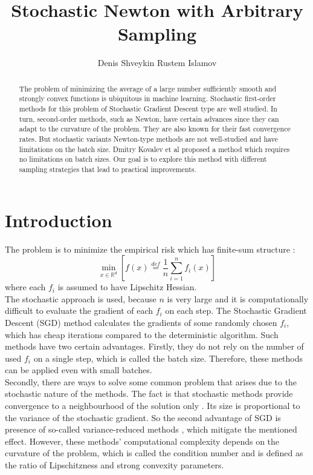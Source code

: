 \documentclass{article}
\title{Stochastic Newton with Arbitrary Sampling}
\author{Denis Shveykin
	\And
	Rustem Islamov
}
\date{}
\begin{document}
	
\maketitle

\begin{abstract}
	
	The problem of minimizing the average of a large number sufficiently smooth and strongly convex functions is ubiquitous in machine learning. Stochastic first-order methods for this problem of Stochastic Gradient Descent type are well studied. In turn, second-order methods, such as Newton, have certain advances since they can adapt to the curvature of the problem. They are also known for their fast convergence rates. But stochastic variants Newton-type methods are not well-studied and have limitations on the batch size. Dmitry Kovalev et al proposed a method which requires no limitations on batch sizes. Our goal is to explore this method with different sampling strategies that lead to practical improvements.
	
\end{abstract}


\keywords{}

\section{Introduction}

	The problem is to minimize the empirical risk which has finite-sum structure \cite{kovalev2019stochastic}:
	\begin{equation}
		\underset{x \in \mathbb R^d}{\min} \left[ f(x) \overset{def}{=} \frac{1}{n} \sum \limits_{i=1}^n f_i(x) \right]
	\end{equation}
	where each $f_i$ is assumed to have Lipschitz Hessian. \\
	
	The stochastic approach is used, because $n$ is very large and it is computationally difficult to evaluate the gradient of each $f_i$ on each step. The Stochastic Gradient Descent (SGD) method \cite{SGD-1} calculates the gradients of some randomly chosen $f_i$, which has cheap iterations compared to the deterministic algorithm. Such methods have two certain advantages. Firstly, they do not rely on the number of used $f_i$ on a single step, which is called the batch size. Therefore, these methods can be applied even with small batches. \\
	
	Secondly, there are ways to solve some common problem that arises due to the stochastic nature of the methods. The fact is that stochastic methods provide convergence to a neighbourhood of the solution only \cite{sgd-hogwild, sgd-general-analysis}. Its size is proportional to the variance of the stochastic gradient. So the second advantage of SGD is presence of so-called variance-reduced methods \cite{exp-convergence, advances-NIPS, unified-sgd, one-method}, which mitigate the mentioned effect. However, these methods' computational complexity depends on the curvature of the problem, which is called the condition number and is defined as the ratio of Lipschitzness and strong convexity parameters. \\
	
\end{document}
